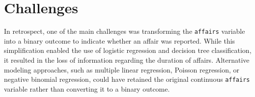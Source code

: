 \documentclass[12pt]{article}
\begin{document}
\section{Challenges}

In retrospect, one of the main challenges was transforming the \verb|affairs| variable into a binary outcome to indicate whether an affair was reported. While this simplification enabled the use of logistic regression and decision tree classification, it resulted in the loss of information regarding the duration of affairs. Alternative modeling approaches, such as multiple linear regression, Poisson regression, or negative binomial regression, could have retained the original continuous \texttt{affairs} variable rather than converting it to a binary outcome.
\end{document}
